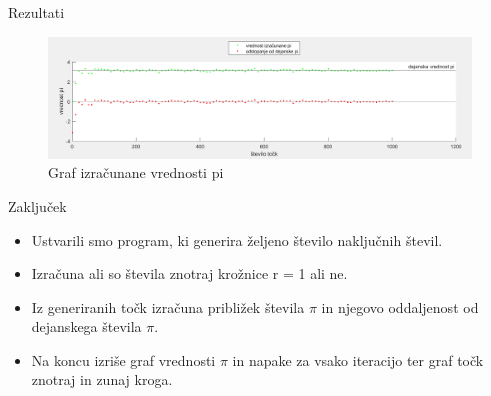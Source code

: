 \documentclass{beamer}
\begin{document}
\begin{frame}{Rezultati}

\begin{center}
    

\begin{figure}[h]

\includegraphics[scale=0.275]{Slike/graf pi.png}
\caption{Graf izračunane vrednosti pi}
\end{figure}
\end{center}

\end{frame}


\begin{frame}{Zaključek}
\begin{itemize}
\item Ustvarili smo program, ki generira željeno število naključnih števil.
\item Izračuna ali so števila znotraj krožnice r = 1 ali ne.
\item Iz generiranih točk izračuna približek števila $\pi$ in njegovo oddaljenost od dejanskega števila $\pi$.
\item Na koncu izriše graf vrednosti $\pi$ in napake za vsako iteracijo ter graf točk znotraj in zunaj kroga.

\end{itemize}
\end{frame}
\end{document}
